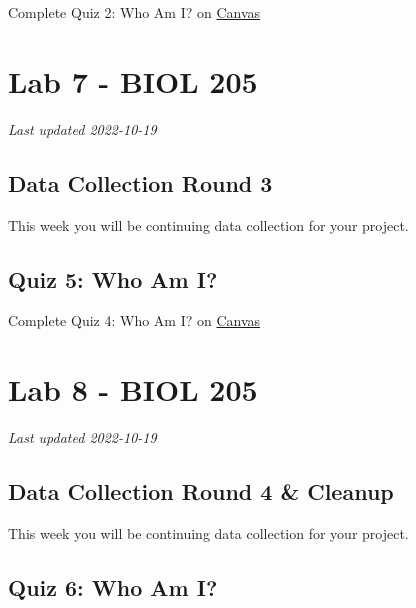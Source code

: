 \documentclass[
]{book}
\begin{document}
Complete Quiz 2: Who Am I? on \href{https://canvas.ubc.ca/courses/113910}{Canvas}

\hypertarget{part-lab-7---biol-205}{%
\part*{Lab 7 - BIOL 205}\label{part-lab-7---biol-205}}

\emph{Last updated 2022-10-19}

\hypertarget{data-collection-round-3}{%
\chapter*{Data Collection Round 3}\label{data-collection-round-3}}

This week you will be continuing data collection for your project.

\hypertarget{quiz-5-who-am-i}{%
\chapter*{Quiz 5: Who Am I?}\label{quiz-5-who-am-i}}

Complete Quiz 4: Who Am I? on \href{https://canvas.ubc.ca/courses/113910}{Canvas}

\hypertarget{part-lab-8---biol-205}{%
\part*{Lab 8 - BIOL 205}\label{part-lab-8---biol-205}}

\emph{Last updated 2022-10-19}

\hypertarget{data-collection-round-4-cleanup}{%
\chapter*{Data Collection Round 4 \& Cleanup}\label{data-collection-round-4-cleanup}}

This week you will be continuing data collection for your project.

\hypertarget{quiz-6-who-am-i}{%
\chapter*{Quiz 6: Who Am I?}\label{quiz-6-who-am-i}}
\end{document}
